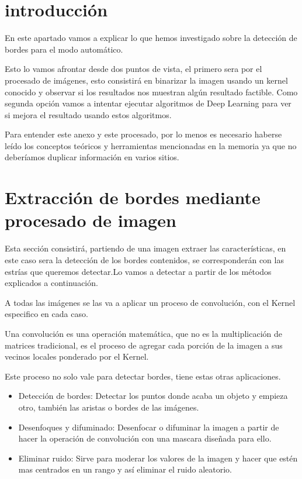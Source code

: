 
\section{introducción}
En este apartado vamos a explicar lo que hemos investigado sobre la detección de bordes para el modo automático.

Esto lo vamos afrontar desde dos puntos de vista, el primero sera por el procesado de imágenes, esto consistirá en binarizar la imagen usando un kernel conocido y observar si los resultados nos muestran algún resultado factible.
Como segunda opción vamos a intentar ejecutar algoritmos de Deep Learning para ver si mejora el resultado usando estos algoritmos.

Para entender este anexo y este procesado, por lo menos es necesario haberse leído los conceptos teóricos y herramientas mencionadas en la memoria ya que no deberíamos duplicar información en varios sitios.

\section{Extracción de bordes mediante procesado de imagen}
Esta sección consistirá, partiendo de una imagen extraer las características, en este caso sera la detección de los bordes contenidos, se corresponderán con las estrías que queremos detectar.Lo vamos a detectar a partir de los métodos explicados a continuación. 

A todas las imágenes se las va a aplicar un proceso de convolución, con el Kernel \cite{wiki:kernels} especifico en cada caso.

Una convolución es una operación matemática, que no es la multiplicación de matrices tradicional, es el proceso de agregar cada porción de la imagen a sus vecinos locales ponderado por el Kernel. 

Este proceso no solo vale para detectar bordes, tiene estas otras aplicaciones.
\begin{itemize}
\item Detección de bordes: Detectar los puntos donde acaba un objeto y empieza otro, también las aristas o bordes de las imágenes.
\item Desenfoques y difuminado: Desenfocar o difuminar la imagen a partir de hacer la operación de convolución con una mascara diseñada para ello.
\item Eliminar ruido: Sirve para moderar los valores de la imagen  y hacer que estén mas centrados en un rango y así eliminar el ruido aleatorio. 
\end{itemize}

